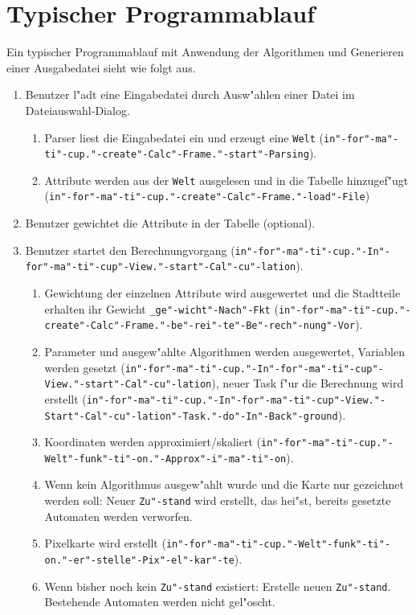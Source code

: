 \section{Typischer Programmablauf}
Ein typischer Programmablauf mit Anwendung der Algorithmen und Generieren einer Ausgabedatei sieht wie folgt aus.
\begin{enumerate}
\item Benutzer l"adt eine Eingabedatei durch Ausw"ahlen einer Datei im Dateiauswahl-Dialog.
\begin{enumerate}
\item Parser liest die Eingabedatei ein und erzeugt eine \texttt{Welt} (\texttt{in"-for"-ma"-ti"-cup."-create"-Calc"-Frame."-start"-Parsing}).
\item Attribute werden aus der \texttt{Welt} ausgelesen und in die Tabelle hinzugef"ugt (\texttt{in"-for"-ma"-ti"-cup."-create"-Calc"-Frame."-load"-File})
\end{enumerate}
\item Benutzer gewichtet die Attribute in der Tabelle (optional).
\item Benutzer startet den Berechnungvorgang (\texttt{in"-for"-ma"-ti"-cup."-In"-for"-ma"-ti"-cup"-View."-start"-Cal"-cu"-lation}).
\begin{enumerate}
\item Gewichtung der einzelnen Attribute wird ausgewertet und die Stadtteile erhalten ihr Gewicht \texttt{\_ge"-wicht"-Nach"-Fkt} (\texttt{in"-for"-ma"-ti"-cup."-create"-Calc"-Frame."-be"-rei"-te"-Be"-rech"-nung"-Vor}).
\item Parameter und ausgew"ahlte Algorithmen werden ausgewertet, Variablen werden gesetzt (\texttt{in"-for"-ma"-ti"-cup."-In"-for"-ma"-ti"-cup"-View."-start"-Cal"-cu"-lation}), neuer Task f"ur die Berechnung wird erstellt (\texttt{in"-for"-ma"-ti"-cup."-In"-for"-ma"-ti"-cup"-View."-Start"-Cal"-cu"-lation"-Task."-do"-In"-Back"-ground}).
\item Koordinaten werden approximiert/skaliert (\texttt{in"-for"-ma"-ti"-cup."-Welt"-funk"-ti"-on."-Approx"-i"-ma"-ti"-on}).
\item Wenn kein Algorithmus ausgew"ahlt wurde und die Karte nur gezeichnet werden soll: Neuer \texttt{Zu"-stand} wird erstellt, das hei"st, bereits gesetzte Automaten werden verworfen.
\item Pixelkarte wird erstellt (\texttt{in"-for"-ma"-ti"-cup."-Welt"-funk"-ti"-on."-er"-stelle"-Pix"-el"-kar"-te}).
\item Wenn bisher noch kein \texttt{Zu"-stand} existiert: Erstelle neuen \texttt{Zu"-stand}. Bestehende Automaten werden nicht gel"oscht.

\end{enumerate}
\end{enumerate}
